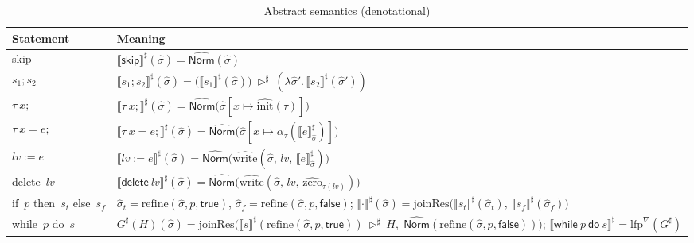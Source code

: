 \documentclass[11pt,oneside]{report}
\renewcommand\arraystretch{1.3}
\theoremstyle{plain}
\theoremstyle{definition}
\theoremstyle{remark}
\newcommand{\Norm}{\mathsf{Norm}}
\begin{document}
\begin{table}[h]
  \caption{Abstract semantics (denotational)}
  \label{tab:abs-denot}
  \centering
  \small
  \setlength{\tabcolsep}{6pt}
  \renewcommand{\arraystretch}{1.12}
  \begin{tabularx}{\columnwidth}{@{}p{} X@{}}
    \toprule
    \textbf{Statement} & \textbf{Meaning} \\
    \midrule
    \textsf{skip} &
    $\llbracket \textsf{skip}\rrbracket^\sharp(\hat{\sigma})=\widehat{\Norm}(\hat{\sigma})$\\

    $s_1; s_2$ &
    $\llbracket s_1; s_2\rrbracket^\sharp(\hat{\sigma})=\big(\llbracket s_1\rrbracket^\sharp(\hat{\sigma})\big)\ \triangleright^\sharp\ (\lambda \hat{\sigma}'.\,\llbracket s_2\rrbracket^\sharp(\hat{\sigma}'))$\\

    $\tau\ x;$ &
    $\llbracket \tau\ x;\rrbracket^\sharp(\hat{\sigma})=\widehat{\Norm}\!\big(\hat{\sigma}[x\mapsto \hat{\mathrm{init}}(\tau)]\big)$\\

    $\tau\ x=e;$ &
    $\llbracket \tau\ x=e;\rrbracket^\sharp(\hat{\sigma})=\widehat{\Norm}\!\big(\hat{\sigma}[x\mapsto \alpha_\tau(\llbracket e\rrbracket^\sharp_{\hat{\sigma}})]\big)$\\

    $\mathit{lv}:=e$ &
    $\llbracket \mathit{lv}:=e\rrbracket^\sharp(\hat{\sigma})=\widehat{\Norm}\!\big(\widehat{\mathrm{write}}(\hat{\sigma},\,\mathit{lv},\,\llbracket e\rrbracket^\sharp_{\hat{\sigma}})\big)$\\

    \textsf{delete}\ $\mathit{lv}$ &
    $\llbracket \textsf{delete}\ \mathit{lv}\rrbracket^\sharp(\hat{\sigma})=\widehat{\Norm}\!\big(\widehat{\mathrm{write}}(\hat{\sigma},\,\mathit{lv},\,\hat{\mathrm{zero}}_{\tau(\mathit{lv})})\big)$\\

    \textsf{if}\ $p$ \textsf{then}\ $s_t$ \textsf{else}\ $s_f$ &
    $\hat{\sigma}_t=\mathrm{refine}(\hat{\sigma},p,\mathsf{true})$, $\hat{\sigma}_f=\mathrm{refine}(\hat{\sigma},p,\mathsf{false})$;
    $\llbracket \cdot\rrbracket^\sharp(\hat{\sigma})=\mathrm{joinRes}\!\big(\llbracket s_t\rrbracket^\sharp(\hat{\sigma}_t),\ \llbracket s_f\rrbracket^\sharp(\hat{\sigma}_f)\big)$\\

    \textsf{while}\ $p$ \textsf{do}\ $s$ &
    $G^\sharp(H)(\hat{\sigma})=\mathrm{joinRes}\big(
      \llbracket s\rrbracket^\sharp(\mathrm{refine}(\hat{\sigma},p,\mathsf{true}))\ \triangleright^\sharp\ H,\;
      \widehat{\Norm}(\mathrm{refine}(\hat{\sigma},p,\mathsf{false}))
    \big)$;
    $\llbracket \textsf{while}\ p\ \textsf{do}\ s\rrbracket^\sharp = \mathrm{lfp}^{\nabla}(G^\sharp)$\\


\end{tabularx}
\end{table}
\end{document}

